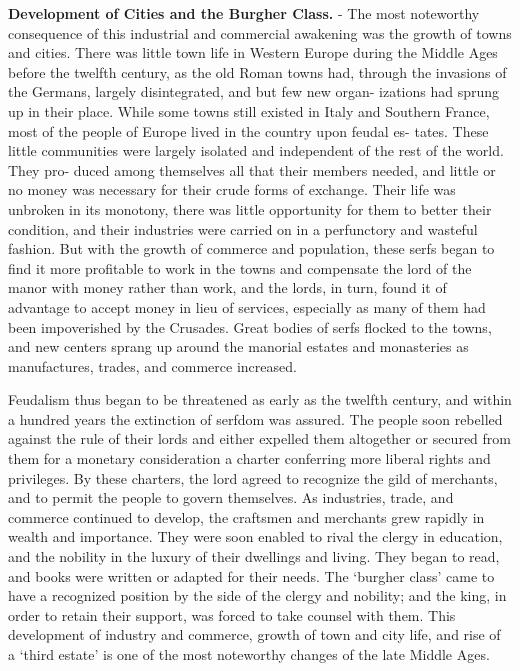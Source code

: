 \documentclass[
]{book}
\begin{document}
\textbf{Development of Cities and the Burgher Class.} - The most noteworthy consequence of this industrial and commercial awakening was the growth of towns and cities. There was little town life in Western Europe during the Middle Ages before the twelfth century, as the old Roman towns had, through the invasions of the Germans, largely disintegrated, and but few new organ- izations had sprung up in their place. While some towns still existed in Italy and Southern France, most of the people of Europe lived in the country upon feudal es- tates. These little communities were largely isolated and independent of the rest of the world. They pro- duced among themselves all that their members needed, and little or no money was necessary for their crude forms of exchange. Their life was unbroken in its monotony, there was little opportunity for them to better their condition, and their industries were carried on in a perfunctory and wasteful fashion. But with the growth of commerce and population, these serfs began to find it more profitable to work in the towns and compensate the lord of the manor with money rather than work, and the lords, in turn, found it of advantage to accept money in lieu of services, especially as many of them had been impoverished by the Crusades. Great bodies of serfs flocked to the towns, and new centers sprang up around the manorial estates and monasteries as manufactures, trades, and commerce increased.

Feudalism thus began to be threatened as early as the twelfth century, and within a hundred years the extinction of serfdom was assured. The people soon rebelled against the rule of their lords and either expelled them altogether or secured from them for a monetary consideration a charter conferring more liberal rights and privileges. By these charters, the lord agreed to recognize the gild of merchants, and to permit the people to govern themselves. As industries, trade, and commerce continued to develop, the craftsmen and merchants grew rapidly in wealth and importance. They were soon enabled to rival the clergy in education, and the nobility in the luxury of their dwellings and living. They began to read, and books were written or adapted for their needs. The `burgher class' came to have a recognized position by the side of the clergy and nobility; and the king, in order to retain their support, was forced to take counsel with them. This development of industry and commerce, growth of town and city life, and rise of a `third estate' is one of the most noteworthy changes of the late Middle Ages.
\end{document}
